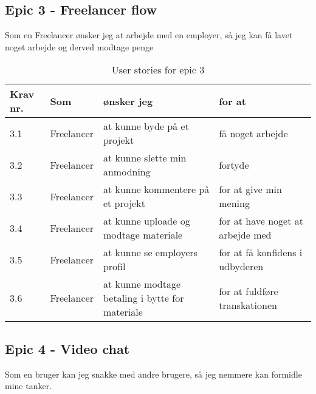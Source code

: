 \subsection{Epic 3 - Freelancer flow}

Som en Freelancer ønsker jeg at arbejde med en employer, så jeg kan få lavet noget arbejde og derved modtage penge

\begin{table}[H]
    \centering
    \caption{User stories for epic 3}
    \label{tab:us-epic3}
    \begin{tabular}{p{1cm}|p{2cm}|p{6cm}|p{6cm}}
        \textbf{Krav nr.} & \textbf{Som} & \textbf{ønsker jeg}                             & \textbf{for at}                  \\
        \hline
        3.1               & Freelancer   & at kunne byde på et projekt                     & få noget arbejde                 \\
        \hline
        3.2               & Freelancer   & at kunne slette min anmodning                   & fortyde                          \\
        \hline
        3.3               & Freelancer   & at kunne kommentere på et projekt               & for at give min mening           \\
        \hline
        3.4               & Freelancer   & at kunne uploade og modtage materiale           & for at have noget at arbejde med \\
        \hline
        3.5               & Freelancer   & at kunne se employers profil                    & for at få konfidens i udbyderen  \\
        \hline
        3.6               & Freelancer   & at kunne modtage betaling i bytte for materiale & for at fuldføre transkationen    \\
    \end{tabular}
\end{table}

\subsection{Epic 4 - Video chat}

Som en bruger kan jeg snakke med andre brugere, så jeg nemmere kan formidle mine tanker.


